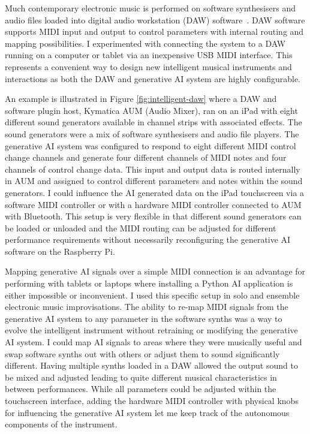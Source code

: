 \documentclass[sigconf]{nimeart}
\begin{document}
Much contemporary electronic music is performed on software synthesisers and audio files loaded into digital audio workstation (DAW) software~\cite{daws-reuter-2021, Clauhs:2023aa}.
DAW software supports MIDI input and output to control parameters with internal routing and mapping possibilities.
I experimented with connecting the system to a DAW running on a computer or tablet via an inexpensive USB MIDI interface.
This represents a convenient way to design new intelligent musical instruments and interactions as both the DAW and generative AI system are highly configurable.

An example is illustrated in Figure \ref{fig:intelligent-daw} where a DAW and software plugin host, Kymatica AUM (Audio Mixer), ran on an iPad with eight different sound generators available in channel strips with associated effects.
The sound generators were a mix of software synthesisers and audio file players.
The generative AI system was configured to respond to eight different MIDI control change channels and generate four different channels of MIDI notes and four channels of control change data.
This input and output data is routed internally in AUM and assigned to control different parameters and notes within the sound generators.
I could influence the AI generated data on the iPad touchscreen via a software MIDI controller or with a hardware MIDI controller connected to AUM with Bluetooth.
This setup is very flexible in that different sound generators can be loaded or unloaded and the MIDI routing can be adjusted for different performance requirements without necessarily reconfiguring the generative AI software on the Raspberry Pi.

Mapping generative AI signals over a simple MIDI connection is an advantage for performing with tablets or laptops where installing a Python AI application is either impossible or inconvenient.
I used this specific setup in solo and ensemble electronic music improvisations.
The ability to re-map MIDI signals from the generative AI system to any parameter in the software synths was a way to evolve the intelligent instrument without retraining or modifying the generative AI system. 
I could map AI signals to areas where they were musically useful and swap software synths out with others or adjust them to sound significantly different. 
Having multiple synths loaded in a DAW allowed the output sound to be mixed and adjusted leading to quite different musical characteristics in between performances. 
While all parameters could be adjusted within the touchscreen interface, adding the hardware MIDI controller with physical knobs for influencing the generative AI system let me keep track of the autonomous components of the instrument.
\end{document}
